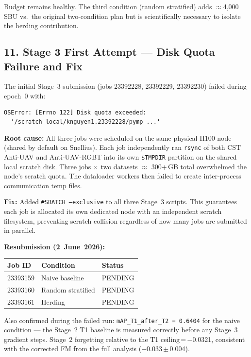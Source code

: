 \noindent Budget remains healthy. The third condition (random stratified)
adds $\approx$4,000\,SBU vs.\ the original two-condition plan but is
scientifically necessary to isolate the herding contribution.

\subsection*{11. Stage 3 First Attempt — Disk Quota Failure and Fix}

The initial Stage~3 submission (jobs 23392228, 23392229, 23392230) failed
during epoch~0 with:

\begin{verbatim}
OSError: [Errno 122] Disk quota exceeded:
  '/scratch-local/knguyen1.23392228/pymp-...'
\end{verbatim}

\noindent \textbf{Root cause:} All three jobs were scheduled on the same
physical H100 node (shared by default on Snellius). Each job independently
ran \texttt{rsync} of both CST Anti-UAV and Anti-UAV-RGBT into its own
\texttt{\$TMPDIR} partition on the shared local scratch disk. Three jobs
$\times$ two datasets $\approx$ 300+\,GB total overwhelmed the node's
scratch quota. The dataloader workers then failed to create inter-process
communication temp files.

\noindent \textbf{Fix:} Added \texttt{\#SBATCH --exclusive} to all three
Stage~3 scripts. This guarantees each job is allocated its own dedicated
node with an independent scratch filesystem, preventing scratch collision
regardless of how many jobs are submitted in parallel.

\noindent \textbf{Resubmission (2~June~2026):}

\begin{center}\small
\begin{tabular}{lll}
\hline
\textbf{Job ID} & \textbf{Condition} & \textbf{Status} \\
\hline
23393159 & Naive baseline        & PENDING \\
23393160 & Random stratified     & PENDING \\
23393161 & Herding               & PENDING \\
\hline
\end{tabular}
\end{center}

\noindent Also confirmed during the failed run: \texttt{mAP\_T1\_after\_T2\,=\,0.6404}
for the naive condition — the Stage~2 T1 baseline is measured correctly
before any Stage~3 gradient steps. Stage~2 forgetting relative to the T1
ceiling\,=\,$-$0.0321, consistent with the corrected FM from the full
analysis ($-$0.033\,$\pm$\,0.004).


